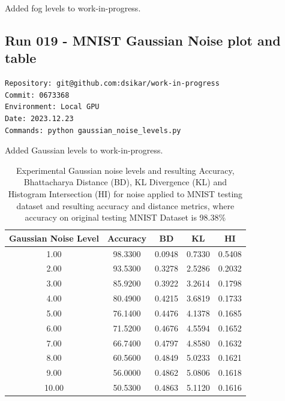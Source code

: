 Added fog levels to work-in-progress.

\subsection{Run 019 - MNIST Gaussian Noise plot and table}
\label{app_res:019}
\begin{verbatim}
Repository: git@github.com:dsikar/work-in-progress
Commit: 0673368
Environment: Local GPU
Date: 2023.12.23
Commands: python gaussian_noise_levels.py 
\end{verbatim}

Added Gaussian levels to work-in-progress.

\begin{table}[ht]
\centering
\begin{tabular}{|c|c|c|c|c|}
\hline
Gaussian Noise Level & Accuracy & BD & KL & HI \\
\hline
1.00 & 98.3300 & 0.0948 & 0.7330 & 0.5408 \\
2.00 & 93.5300 & 0.3278 & 2.5286 & 0.2032 \\
3.00 & 85.9200 & 0.3922 & 3.2614 & 0.1798 \\
4.00 & 80.4900 & 0.4215 & 3.6819 & 0.1733 \\
5.00 & 76.1400 & 0.4476 & 4.1378 & 0.1685 \\
6.00 & 71.5200 & 0.4676 & 4.5594 & 0.1652 \\
7.00 & 66.7400 & 0.4797 & 4.8580 & 0.1632 \\
8.00 & 60.5600 & 0.4849 & 5.0233 & 0.1621 \\
9.00 & 56.0000 & 0.4862 & 5.0806 & 0.1618 \\
10.00 & 50.5300 & 0.4863 & 5.1120 & 0.1616 \\
\hline
\end{tabular}
\caption{Experimental Gaussian noise levels and resulting Accuracy, Bhattacharya Distance (BD), KL Divergence (KL) and Histogram Intersection (HI) for noise applied to MNIST testing dataset and resulting accuracy and distance metrics, where accuracy on original testing MNIST Dataset is 98.38\%}
\label{tbl-fog-levels}
\end{table}

